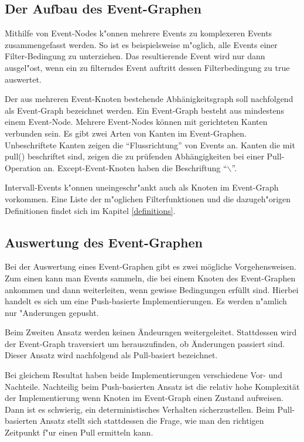\subsection{Der Aufbau des Event-Graphen}
Mithilfe von Event-Nodes k"onnen mehrere Events zu komplexeren Events
zusammengefasst werden. So ist es beispielsweise m"oglich, alle Events einer
Filter-Bedingung zu unterziehen. Das resultierende Event wird nur dann
ausgel"ost, wenn ein zu filterndes Event auftritt dessen Filterbedingung zu true
auswertet. 

Der aus mehreren Event-Knoten bestehende Abhänigkeitsgraph soll nachfolgend als Event-Graph bezeichnet werden. Ein Event-Graph besteht aus mindestens einem Event-Node. 
Mehrere Event-Nodes können mit gerichteten Kanten verbunden sein. Es gibt zwei Arten von Kanten im Event-Graphen. Unbeschriftete Kanten
zeigen die ``Flussrichtung'' von Events an. Kanten die mit pull() beschriftet
sind, zeigen die zu prüfenden Abhängigkeiten bei einer Pull-Operation an.
Except-Event-Knoten haben die Beschriftung ``$\backslash$''.

Intervall-Events k"onnen uneingeschr"ankt auch als Knoten im Event-Graph
vorkommen. Eine Liste der m"oglichen Filterfunktionen und die dazugeh"origen
Definitionen findet sich im Kapitel \ref{definitions}.

\subsection{Auswertung des Event-Graphen}

Bei der Auswertung eines Event-Graphen gibt es zwei mögliche Vorgehensweisen.
Zum einen kann man Events sammeln, die bei einem Knoten des Event-Graphen
ankommen und dann weiterleiten, wenn gewisse Bedingungen erfüllt sind. Hierbei handelt es sich um
eine Push-basierte Implementierungen. Es werden n"amlich nur "Anderungen gepusht.

Beim Zweiten Ansatz werden keinen Ändeurngen weitergeleitet. Stattdessen wird
der Event-Graph traversiert um herauszufinden, ob Änderungen passiert sind. Dieser
Ansatz wird nachfolgend als Pull-basiert bezeichnet.

Bei gleichem Resultat haben beide Implementierungen verschiedene Vor- und
Nachteile. Nachteilig beim Push-basierten Ansatz ist die relativ hohe Komplexität
der Implementierung wenn Knoten im Event-Graph einen Zustand aufweisen.
Dann ist es schwierig, ein deterministisches Verhalten sicherzustellen. Beim
Pull-basierten Ansatz stellt sich stattdessen die Frage, wie man den richtigen
Zeitpunkt f"ur einen Pull ermitteln kann. 

